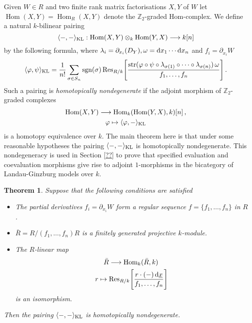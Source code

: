 \documentclass{compositio}
\newtheorem{theorem}{Theorem}[section]
\theoremstyle{definition}
\numberwithin{equation}{section}
\newcommand{\Ress}[1]{\res_{#1}\!}
\def\res{\operatorname{Res}}
\def\sgn{\operatorname{sgn}}
\def\Hom{\operatorname{Hom}}
\DeclareMathOperator{\str}{str}
\begin{document}
Given $W \in R$ and two finite rank matrix factorisations $X,Y$ of $W$ let $\Hom(X,Y) = \Hom_R(X,Y)$ denote the $\mathbb{Z}_2$-graded Hom-complex. We define a natural $k$-bilinear pairing
\[
\langle -, - \rangle_{\textup{KL}}: \Hom(X,Y) \otimes_k \Hom(Y,X) \lto k[n]
\]
by the following formula, where $\lambda_i = \partial_{x_i}(D_Y), \omega = \mathrm{d} x_1 \cdots \mathrm{d} x_n$ and $f_i = \partial_{x_i} W$
\begin{equation}\label{eq:generalklpairing}
\langle \varphi, \psi \rangle_{\textup{KL}} = \frac{1}{n!} \sum_{\sigma \in S_n} \sgn(\sigma) \Ress{R/k}\Bigg[ \frac{ \str( \varphi \circ \psi \circ \lambda_{\sigma(1)} \circ \cdots \circ \lambda_{\sigma(n)} )\, \omega }{ f_1,\ldots,f_n } \Bigg]\,.
\end{equation}
Such a pairing is \emph{homotopically nondegenerate} if the adjoint morphism of $\mathbb{Z}_2$-graded complexes
\begin{gather*}
\Hom(X,Y) \lto \Hom_k( \Hom(Y,X), k )[n]\,,\\
\varphi \mapsto \langle \varphi, - \rangle_{\textup{KL}}
\end{gather*}
is a homotopy equivalence over $k$. The main theorem here is that under some reasonable hypotheses the pairing $\langle -, - \rangle_{\textup{KL}}$ is homotopically nondegenerate. This nondegeneracy is used in Section \ref{??} to prove that specified evaluation and coevaluation morphisms give rise to adjoint $1$-morphisms in the bicategory of Landau-Ginzburg models over $k$.

\begin{theorem}\label{theorem:generalkl} Suppose that the following conditions are satisfied
\begin{itemize}
\item[(H1)] The partial derivatives $f_i = \partial_{x_i} W$ form a regular sequence $f = \{f_1,\ldots,f_n\}$ in $R$.
\item[(H2)] $\bar{R} = R/(f_1,\ldots,f_n)R$ is a finitely generated projective $k$-module.
\item[(H3)] The $R$-linear map
\begin{gather*}
\bar{R} \lto \Hom_k( \bar{R}, k)\,\\
r \mapsto \Ress{R/k}\Bigg[ \frac{r \cdot (-) \, \ud \underline{x}}{ f_1, \ldots, f_n} \Bigg]
\end{gather*}
is an isomorphism.
\end{itemize}
Then the pairing $\langle -, - \rangle_{\textup{KL}}$ is homotopically nondegenerate.
\end{theorem}
\end{document}
